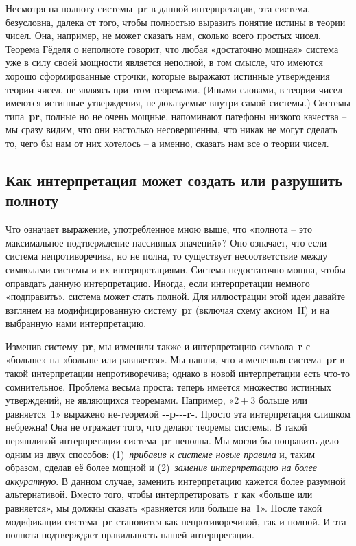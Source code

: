 \documentclass[../main.tex]{subfiles}
\begin{document}
Несмотря на полноту системы~\textbf{pr} в данной интерпретации, эта система, безусловна, далека от того, чтобы полностью выразить понятие истины в теории чисел. Она, например, не может сказать нам, сколько всего простых чисел. Теорема Гёделя о неполноте говорит, что любая «достаточно мощная» система уже в силу своей мощности является неполной, в том смысле, что имеются хорошо сформированные строчки, которые выражают истинные утверждения теории чисел, не являясь при этом теоремами. (Иными словами, в теории чисел имеются истинные утверждения, не доказуемые внутри самой системы.) Системы типа~\textbf{pr}, полные но не очень мощные, напоминают патефоны низкого качества \--- мы сразу видим, что они настолько несовершенны, что никак не могут сделать то, чего бы нам от них хотелось \--- а именно, сказать нам все о теории чисел.


\subsection{Как интерпретация может создать или разрушить полноту}

Что означает выражение, употребленное мною выше, что «полнота \--- это максимальное подтверждение пассивных значений»? Оно означает, что если система непротиворечива, но не полна, то существует несоответствие между символами системы и их интерпретациями. Система недостаточно мощна, чтобы оправдать данную интерпретацию. Иногда, если интерпретации немного «подправить», система может стать полной. Для иллюстрации этой идеи давайте взглянем на модифицированную систему~\textbf{pr} (включая схему аксиом~II) и на выбранную нами интерпретацию.

Изменив систему~\textbf{pr}, мы изменили также и интерпретацию символа~\textbf{r} с «больше» на «больше или равняется». Мы нашли, что измененная система~\textbf{pr} в такой интерпретации непротиворечива; однако в новой интерпретации есть что-то сомнительное. Проблема весьма проста: теперь имеется множество истинных утверждений, не являющихся теоремами. Например, «$2 + 3$ больше или равняется~$1$» выражено не-теоремой \textbf{-{}-p-{}-{}-r-}. Просто эта интерпретация слишком небрежна! Она не отражает того, что делают теоремы системы. В такой неряшливой интерпретации система~\textbf{pr} неполна. Мы могли бы поправить дело одним из двух способов: (1)~\emph{прибавив к системе новые правила} и, таким образом, сделав её более мощной и (2)~\emph{заменив интерпретацию на более аккуратную}. В данном случае, заменить интерпретацию кажется более разумной альтернативой. Вместо того, чтобы интерпретировать~\textbf{r} как «больше или равняется», мы должны сказать «равняется или больше на~1». После такой модификации система~\textbf{pr} становится как непротиворечивой, так и полной. И эта полнота подтверждает правильность нашей интерпретации.
\end{document}
